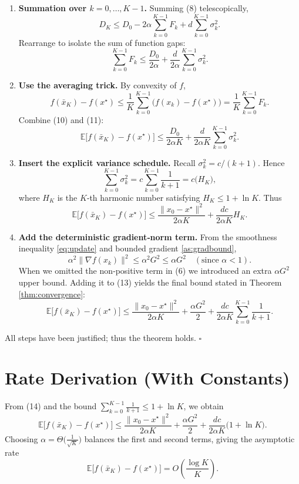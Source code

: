 \documentclass{article}
\begin{document}
\begin{enumerate}
\item \textbf{Summation over $k=0,\dots,K-1$.}  
Summing (8) telescopically,
\[
D_{K}\le D_{0}-2\alpha\sum_{k=0}^{K-1}F_{k}+d\sum_{k=0}^{K-1}\sigma_k^{2}. \tag{9}
\]
Rearrange to isolate the sum of function gaps:
\[
\sum_{k=0}^{K-1}F_{k}\le \frac{D_{0}}{2\alpha}+ \frac{d}{2\alpha}\sum_{k=0}^{K-1}\sigma_k^{2}. \tag{10}
\]

\item \textbf{Use the averaging trick.}  
By convexity of $f$,
\[
f(\bar x_{K})-f(x^{\star})\le\frac{1}{K}\sum_{k=0}^{K-1}\big(f(x_k)-f(x^{\star})\big)
= \frac{1}{K}\sum_{k=0}^{K-1}F_{k}. \tag{11}
\]
Combine (10) and (11):
\[
\mathbb{E}\!\big[f(\bar x_{K})-f(x^{\star})\big]
\le \frac{D_{0}}{2\alpha K}
+ \frac{d}{2\alpha K}\sum_{k=0}^{K-1}\sigma_k^{2}. \tag{12}
\]

\item \textbf{Insert the explicit variance schedule.}  
Recall $\sigma_k^{2}=c/(k+1)$. Hence
\[
\sum_{k=0}^{K-1}\sigma_k^{2}=c\sum_{k=0}^{K-1}\frac{1}{k+1}
= c\big(H_{K}\big),
\]
where $H_{K}$ is the $K$‑th harmonic number satisfying $H_{K}\le 1+\ln K$.  
Thus
\[
\mathbb{E}\!\big[f(\bar x_{K})-f(x^{\star})\big]
\le \frac{\|x_{0}-x^{\star}\|^{2}}{2\alpha K}
+ \frac{d c}{2\alpha K}H_{K}. \tag{13}
\]

\item \textbf{Add the deterministic gradient‑norm term.}  
From the smoothness inequality \eqref{eq:update} and bounded gradient \ref{as:gradbound},
\[
\alpha^{2}\|\nabla f(x_k)\|^{2}\le \alpha^{2}G^{2}\le \alpha G^{2}\quad(\text{since }\alpha<1). 
\]
When we omitted the non‑positive term in (6) we introduced an extra \(\alpha G^{2}\) upper bound. Adding it to (13) yields the final bound stated in Theorem \ref{thm:convergence}:
\[
\boxed{
\mathbb{E}\!\big[f(\bar x_{K})-f(x^{\star})\big]
\le
\frac{\|x_{0}-x^{\star}\|^{2}}{2\alpha K}
+\frac{\alpha G^{2}}{2}
+\frac{d c}{2\alpha K}\sum_{k=0}^{K-1}\frac{1}{k+1}
}.
\] 
\end{enumerate}
All steps have been justified; thus the theorem holds. \hfill $\square$

\section*{Rate Derivation (With Constants)}
From (14) and the bound $ \sum_{k=0}^{K-1}\frac{1}{k+1}\le 1+\ln K$, we obtain
\[
\mathbb{E}\!\big[f(\bar x_{K})-f(x^{\star})\big]
\le
\frac{\|x_{0}-x^{\star}\|^{2}}{2\alpha K}
+\frac{\alpha G^{2}}{2}
+\frac{d c}{2\alpha K}\big(1+\ln K\big).
\]
Choosing $\alpha = \Theta\!\big(\frac{1}{\sqrt{K}}\big)$ balances the first and second terms, giving the asymptotic rate
\[
\mathbb{E}\!\big[f(\bar x_{K})-f(x^{\star})\big]=O\!\left(\frac{\log K}{K}\right).
\]
\end{document}
